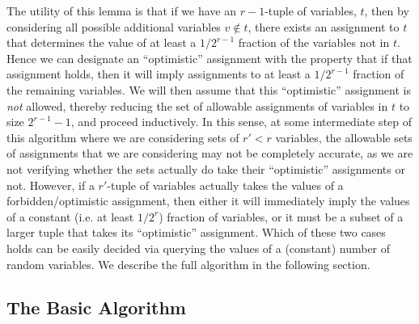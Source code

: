 \documentclass[anon,12pt]{colt2018}
\begin{document}
The utility of this lemma is that if we have an $r-1$-tuple of variables, $t$, then by considering all possible additional variables $v \not \in t$, there exists an assignment to $t$ that determines the value of at least a $1/2^{r-1}$ fraction of the variables not in $t$.  Hence we can designate an ``optimistic'' assignment with the property that if that assignment holds, then it will imply assignments to at least a $1/2^{r-1}$ fraction of the remaining variables.   We will then assume that this ``optimistic'' assignment is \emph{not} allowed, thereby reducing the set of allowable assignments of variables in $t$ to size $2^{r-1}-1$, and proceed inductively.      In this sense, at some intermediate step of this algorithm where we are considering sets of $r' < r$ variables, the allowable sets of assignments that we are considering may not be completely accurate, as we are not verifying whether the sets actually do take their ``optimistic'' assignments or not.  However, if a $r'$-tuple of variables actually takes the values of a forbidden/optimistic assignment, then either it will immediately imply the values of a constant (i.e. at least $1/2^r$) fraction of variables, or it must be a subset of a larger tuple that takes its ``optimistic'' assignment.  Which of these two cases holds can be easily decided via querying the values of a (constant) number of random variables.  We describe the full algorithm in the following section.





\iffalse

promote the following, maybe just have it as an observation earlier??
We begin with three concrete examples that illustrate some basic properties of the model.

\begin{example}
Consider the setting where the underlying assignment to all $n$ variables is $T$, and each worker evaluates a set of $c$ variables.  If $\alpha \le 1/2^c$, then the remaining $(1-\alpha)$ fraction of the workers could return assignments in such a way that the distribution of assignments to each set of $c$ variables is uniform over the set of $2^c$ possible assignments, and hence the dataset will contain no information about the true assignments.  [SHOULD WE DESCRIBE THE MORE GENERAL SETTING where the reliable workers have some probability of errors?]
\end{example} 
\fi



\subsection{The Basic Algorithm}\label{sec:fullalg}
\end{document}
